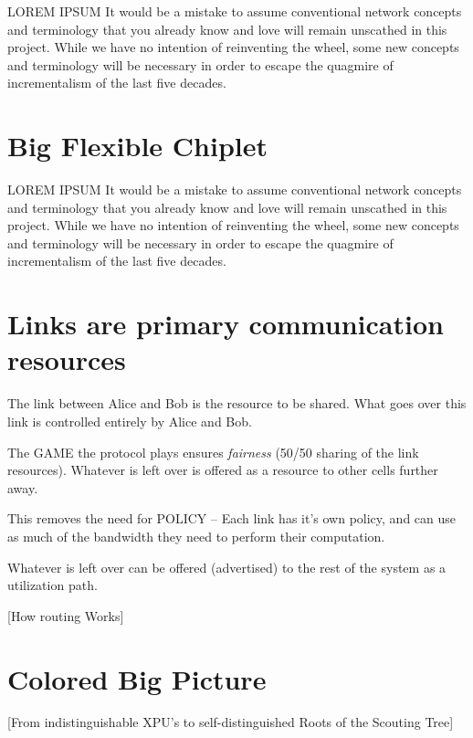 \documentclass[../../../OAE-SPEC-MAIN.tex]{subfiles}
\begin{document}

LOREM IPSUM It would be a mistake to assume conventional network concepts and terminology that you already know and love will remain unscathed in this project. While we have no intention of reinventing the wheel,  some new concepts and terminology will be necessary in order to escape the quagmire of incrementalism of the last five decades.  



\section{Big Flexible Chiplet}

LOREM IPSUM It would be a mistake to assume conventional network concepts and terminology that you already know and love will remain unscathed in this project. While we have no intention of reinventing the wheel,  some new concepts and terminology will be necessary in order to escape the quagmire of incrementalism of the last five decades.  




\section{Links are primary communication resources}

The link between Alice and Bob is the resource to be shared.  What goes over this link is controlled entirely by Alice and Bob.

The GAME the protocol plays ensures \emph{fairness} (50/50 sharing of the link resources). Whatever is left over is offered as a resource to other cells further away.

This removes the need for POLICY -- Each link has it's own policy, and can use as much of the bandwidth they need to perform their computation.

Whatever is left over can be offered (advertised) to the rest of the system as a utilization path.

\clearpage

[How routing Works]

\clearpage

\section{Colored Big Picture}
[From indistinguishable XPU's to self-distinguished Roots of the Scouting Tree]
\end{document}
